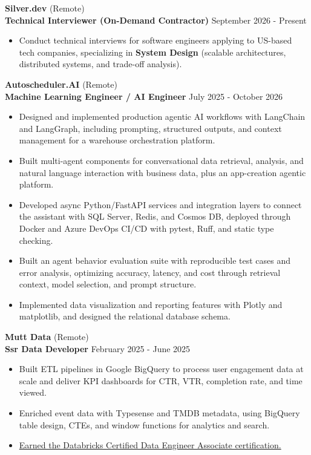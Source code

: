 \documentclass[10pt]{article}
\begin{document}
\textbf{Silver.dev} \hfill (Remote)\\
\textbf{Technical Interviewer (On-Demand Contractor)} \hfill September 2026 - Present
\begin{itemize}[noitemsep, topsep=0pt, partopsep=0pt, parsep=0pt]
    \item Conduct technical interviews for software engineers applying to US-based tech companies, specializing in \textbf{System Design} (scalable architectures, distributed systems, and trade-off analysis).
\end{itemize}
\vspace{2pt}
\textbf{Autoscheduler.AI} \hfill (Remote)\\
\textbf{Machine Learning Engineer / AI Engineer} \hfill July 2025 - October 2026
\begin{itemize}[noitemsep, topsep=0pt, partopsep=0pt, parsep=0pt]
    \item Designed and implemented production agentic AI workflows with LangChain and LangGraph, including prompting, structured outputs, and context management for a warehouse orchestration platform.
    \item Built multi-agent components for conversational data retrieval, analysis, and natural language interaction with business data, plus an app-creation agentic platform.
    \item Developed async Python/FastAPI services and integration layers to connect the assistant with SQL Server, Redis, and Cosmos DB, deployed through Docker and Azure DevOps CI/CD with pytest, Ruff, and static type checking.
    \item Built an agent behavior evaluation suite with reproducible test cases and error analysis, optimizing accuracy, latency, and cost through retrieval context, model selection, and prompt structure.
    \item Implemented data visualization and reporting features with Plotly and matplotlib, and designed the relational database schema.
\end{itemize}
\vspace{2pt}
\textbf{Mutt Data} \hfill (Remote)\\
\textbf{Ssr Data Developer} \hfill February 2025 - June 2025
\begin{itemize}[noitemsep, topsep=0pt, partopsep=0pt, parsep=0pt]
    \item Built ETL pipelines in Google BigQuery to process user engagement data at scale and deliver KPI dashboards for CTR, VTR, completion rate, and time viewed.
    \item Enriched event data with Typesense and TMDB metadata, using BigQuery table design, CTEs, and window functions for analytics and search.
    \item \href{https://credentials.databricks.com/838212fa-8d2c-4e5d-b146-ba2f1af0e39d\#acc.uF1sAh5D}{Earned the Databricks Certified Data Engineer Associate certification.}
\end{itemize}
\end{document}
